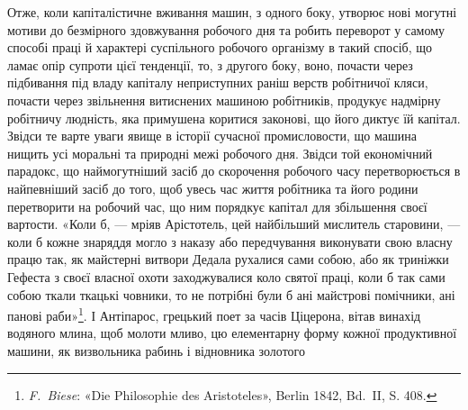 Отже, коли капіталістичне вживання машин, з одного боку,
утворює нові могутні мотиви до безмірного здовжування робочого
дня та робить переворот у самому способі праці й характері суспільного
робочого організму в такий спосіб, що ламає опір супроти
цієї тенденції, то, з другого боку, воно, почасти через підбивання
під владу капіталу неприступних раніш верств робітничої кляси,
почасти через звільнення витиснених машиною робітників, продукує
надмірну робітничу людність, яка примушена коритися
законові, що його диктує їй капітал. Звідси те варте уваги явище в
історії сучасної промисловости, що машина нищить усі моральні та
природні межі робочого дня. Звідси той економічний парадокс, що
наймогутніший засіб до скорочення робочого часу перетворюється
в найпевніший засіб до того, щоб увесь час життя робітника та
його родини перетворити на робочий час, що ним порядкує капітал
для збільшення своєї вартости. «Коли б, — мріяв Арістотель,
цей найбільший мислитель старовини, — коли б кожне знаряддя
могло з наказу або передчування виконувати свою власну працю
так, як майстерні витвори Дедала рухалися сами собою, або як
триніжки Гефеста з своєї власної охоти заходжувалися коло святої
праці, коли б так сами собою ткали ткацькі човники, то не потрібні
були б ані майстрові помічники, ані панові раби»\footnote{
\emph{F.~Biese}: «Die Philosophie des Aristoteles», Berlin 1842, Bd.~II,
S. 408.
}. І Антіпарос,
грецький поет за часів Ціцерона, вітав винахід водяного
млина, щоб молоти мливо, цю елементарну форму кожної
продуктивної машини, як визвольника рабинь і відновника золотого
